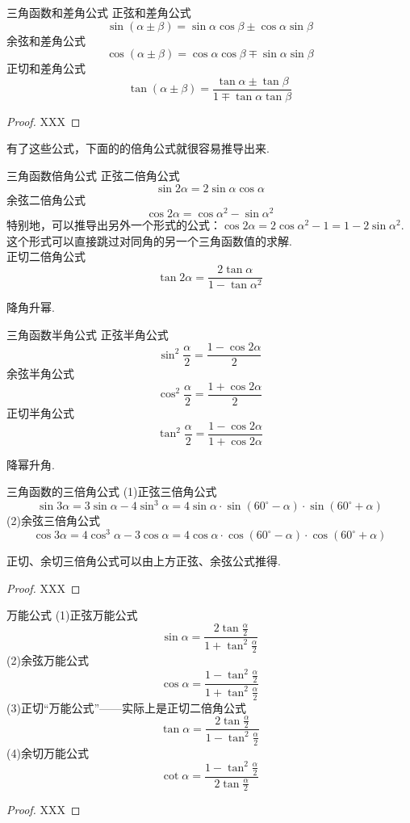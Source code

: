 \documentclass[lang=cn, zihao=5]{elegantbook}
\begin{document}
\begin{theorem}{三角函数和差角公式} %
    正弦和差角公式$$\sin{(\alpha \pm \beta)}=\sin{\alpha}\cos{\beta} \pm \cos{\alpha}\sin{\beta}$$
    余弦和差角公式$$\cos{(\alpha \pm \beta)}=\cos{\alpha}\cos{\beta} \mp \sin{\alpha}\sin{\beta}$$
    正切和差角公式$$\tan{(\alpha \pm \beta)}=\frac{\tan{\alpha} \pm \tan{\beta}}{1 \mp \tan{\alpha}\tan{\beta}}$$
\end{theorem}
\begin{proof}
    XXX
\end{proof}

有了这些公式，下面的的倍角公式就很容易推导出来.

\begin{proposition}{三角函数倍角公式} %
    正弦二倍角公式$$\sin{2\alpha}=2\sin{\alpha}\cos{\alpha}$$
    余弦二倍角公式$$\cos{2\alpha}=\cos{\alpha ^2}-\sin{\alpha ^2}$$
    特别地，可以推导出另外一个形式的公式：$\cos{2\alpha}=2\cos{\alpha ^2}-1=1-2\sin{\alpha ^2}$.这个形式可以直接跳过对同角的另一个三角函数值的求解.\\
    正切二倍角公式$$\tan{2\alpha}=\frac{2\tan{\alpha}}{1-\tan{\alpha ^2}}$$
\end{proposition}

降角升幂.

\begin{proposition}{三角函数半角公式} %
    正弦半角公式$$\sin ^2 \frac{\alpha}{2}=\frac{1-\cos{2\alpha}}{2}$$
    余弦半角公式$$\cos ^2 \frac{\alpha}{2}=\frac{1+\cos{2\alpha}}{2}$$
    正切半角公式$$\tan ^2 \frac{\alpha}{2}=\frac{1-\cos{2\alpha}}{1+\cos{2\alpha}}$$
\end{proposition}

降幂升角.

\begin{proposition}{三角函数的三倍角公式} %
    (1)正弦三倍角公式$$\sin{3\alpha}=3\sin{\alpha}-4\sin^3 \alpha=4\sin{\alpha} \cdot \sin{(60^{\circ}-\alpha)} \cdot \sin{(60^{\circ}+\alpha)}$$
    (2)余弦三倍角公式$$\cos{3\alpha}=4\cos^3 \alpha-3\cos{\alpha}=4\cos{\alpha} \cdot \cos{(60^{\circ}-\alpha)} \cdot \cos{(60^{\circ}+\alpha)}$$
\end{proposition}
\begin{remark}
    正切、余切三倍角公式可以由上方正弦、余弦公式推得.
\end{remark}
\begin{proof}
    XXX
\end{proof}

\begin{proposition}{万能公式} %
    (1)正弦万能公式$$\sin{\alpha}=\frac{2\tan{\frac{\alpha}{2}}}{1+\tan^2{\frac{\alpha}{2}}}$$
    (2)余弦万能公式$$\cos{\alpha}=\frac{1-\tan^2{\frac{\alpha}{2}}}{1+\tan^2{\frac{\alpha}{2}}}$$
    (3)正切“万能公式”——实际上是正切二倍角公式$$\tan{\alpha}=\frac{2\tan{\frac{\alpha}{2}}}{1-\tan^2{\frac{\alpha}{2}}}$$
    (4)余切万能公式$$\cot{\alpha}=\frac{1-\tan^2{\frac{\alpha}{2}}}{2\tan{\frac{\alpha}{2}}}$$
\end{proposition}
\begin{proof}
    XXX
\end{proof}
\end{document}
